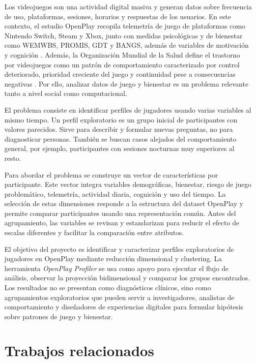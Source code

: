 \documentclass[12pt,a4paper]{article}
\begin{document}
Los videojuegos son una actividad digital masiva y generan datos sobre frecuencia de uso, plataformas, sesiones, horarios y respuestas de los usuarios. En este contexto, el estudio OpenPlay recopila telemetr\'ia de juego de plataformas como Nintendo Switch, Steam y Xbox, junto con medidas psicol\'ogicas y de bienestar como WEMWBS, PROMIS, GDT y BANGS, adem\'as de variables de motivaci\'on y cognici\'on \cite{openplay}. Adem\'as, la Organizaci\'on Mundial de la Salud define el trastorno por videojuegos como un patr\'on de comportamiento caracterizado por control deteriorado, prioridad creciente del juego y continuidad pese a consecuencias negativas \cite{who}. Por ello, analizar datos de juego y bienestar es un problema relevante tanto a nivel social como computacional.

El problema consiste en identificar perfiles de jugadores usando varias variables al mismo tiempo. Un perfil exploratorio es un grupo inicial de participantes con valores parecidos. Sirve para describir y formular nuevas preguntas, no para diagnosticar personas. Tambi\'en se buscan casos alejados del comportamiento general, por ejemplo, participantes con sesiones nocturnas muy superiores al resto.

Para abordar el problema se construye un vector de caracter\'isticas por participante. Este vector integra variables demogr\'aficas, bienestar, riesgo de juego problem\'atico, telemetr\'ia, actividad diaria, cognici\'on y uso del tiempo. La selecci\'on de estas dimensiones responde a la estructura del dataset OpenPlay y permite comparar participantes usando una representaci\'on com\'un. Antes del agrupamiento, las variables se revisan y estandarizan para reducir el efecto de escalas diferentes y facilitar la comparaci\'on entre atributos.

El objetivo del proyecto es identificar y caracterizar perfiles exploratorios de jugadores en OpenPlay mediante reducci\'on dimensional y clustering. La herramienta \textit{OpenPlay Profiler} se usa como apoyo para ejecutar el flujo de an\'alisis, observar la proyecci\'on bidimensional y comparar los grupos encontrados. Los resultados no se presentan como diagn\'osticos cl\'inicos, sino como agrupamientos exploratorios que pueden servir a investigadores, analistas de comportamiento y dise\~nadores de experiencias digitales para formular hip\'otesis sobre patrones de juego y bienestar.

\section{Trabajos relacionados}
\end{document}
